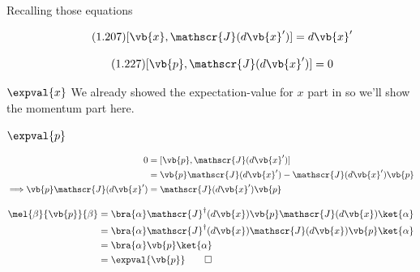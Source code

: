 \begin{answer}
  
  Recalling those equations

  \begin{equation}
    \tag{1.207}
        [\vb{x}, \mathscr{J}(d\vb{x}')] = d\vb{x}'
  \end{equation}

  \begin{equation}
    \tag{1.227}
        [\vb{p}, \mathscr{J}(d\vb{x}')] = 0
  \end{equation}

  \begin{answerpart}{\texorpdfstring{$\expval{x}$}{<x>}}
    We already showed the expectation-value for $x$ part in
     so we'll show the momentum part here.
  \end{answerpart}

  \begin{answerpart}{\texorpdfstring{$\expval{p}$}{<p>}}

    \begin{equation}
      \begin{alignedat}{2}
        &&0
        &=
        [\vb{p}, \mathscr{J}(d\vb{x}')]
        \\
        &&&=
        \vb{p}\mathscr{J}(d\vb{x}') - \mathscr{J}(d\vb{x}')\vb{p}
        \\
        \implies&&
        \vb{p}\mathscr{J}(d\vb{x}')
        &= \mathscr{J}(d\vb{x}')\vb{p}
        \\
      \end{alignedat}
    \end{equation}

    \begin{equation}
      \begin{split}
        \mel{\beta}{\vb{p}}{\beta}
        &=
        \bra{\alpha}
        \mathscr{J}^\dagger(d\vb{x})
        \vb{p}
        \mathscr{J}(d\vb{x})
        \ket{\alpha}
        \\
        &=
        \bra{\alpha}
        \mathscr{J}^\dagger(d\vb{x})
        \mathscr{J}(d\vb{x})
        \vb{p}
        \ket{\alpha}
        \\
        &=
        \bra{\alpha}
        \vb{p}
        \ket{\alpha}
        \\
        &=
        \expval{\vb{p}}\qed
        \\
      \end{split}
    \end{equation}
  \end{answerpart}
  
\end{answer}
